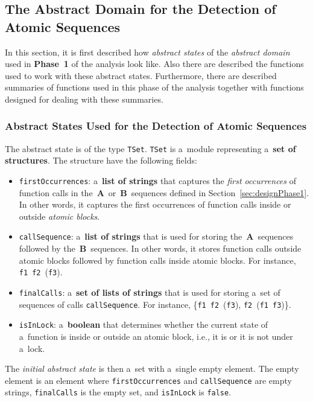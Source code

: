 \subsection{The Abstract Domain for the Detection of Atomic Sequences}
\label{sec:implementPhase1Domain}

In this section, it is first described how \emph{abstract states} of
the \emph{abstract domain} used in \textbf{Phase~1} of the analysis
look like. Also there are described the functions used to work with
these abstract states. Furthermore, there are described summaries
of functions used in this phase of the analysis together with functions
designed for dealing with these summaries.

\subsubsection{%
    Abstract States Used for the Detection of Atomic Sequences
}

The abstract state is of the type \texttt{TSet}. \texttt{TSet} is a~module
representing a~\textbf{set of structures}. The structure have the following
fields:
\begin{itemize}
    \item
        \texttt{firstOccurrences}: a~\textbf{list of strings} that captures
        the \emph{first occurrences} of function calls in
        the~\textbf{A}~or~\textbf{B}~sequences defined in
        Section~\ref{sec:designPhase1}. In other words, it captures
        the first occurrences of function calls inside or outside
        \emph{atomic blocks}.

    \item
        \texttt{callSequence}: a~\textbf{list of strings} that is used for
        storing the~\textbf{A}~sequences followed by
        the~\textbf{B}~sequences. In other words, it stores function calls
        outside atomic blocks followed by function calls inside atomic
        blocks. For instance, \texttt{f1}~\texttt{f2}~(\texttt{f3}).

    \item
        \texttt{finalCalls}: a~\textbf{set of lists of strings} that is
        used for storing a~set of sequences of calls \texttt{callSequence}.
        For instance, \{\texttt{f1}~\texttt{f2}~(\texttt{f3}),
        \texttt{f2}~(\texttt{f1}~\texttt{f3})\}.

    \item
        \texttt{isInLock}: a~\textbf{boolean} that determines whether the
        current state of a~function is inside or outside an atomic block,
        i.e., it is or it is not under a~lock.
\end{itemize}
The \emph{initial abstract state} is then a~set with a~single empty element.
The empty element is an element where \texttt{firstOccurrences} and
\texttt{callSequence} are empty strings, \texttt{finalCalls} is the empty
set, and \texttt{isInLock} is \texttt{false}.

